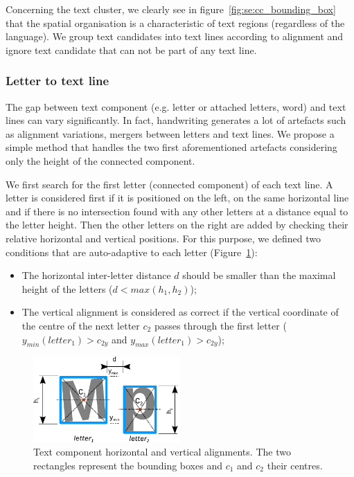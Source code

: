 Concerning the text cluster, we clearly see in figure~\ref{fig:se:cc_bounding_box} that the spatial organisation is a characteristic of text regions (regardless of the language).
We group text candidates into text lines according to alignment and ignore text candidate that can not be part of any text line.

\subsubsection{Letter to text line} %
\label{par:se:letter_to_line}
The gap between text component (e.g. letter or attached letters, word) and text lines can vary significantly.
In fact, handwriting generates a lot of artefacts such as alignment variations, mergers between letters and text lines.
We propose a simple method that handles the two first aforementioned artefacts considering only the height of the connected component.

We first search for the first letter (connected component) of each text line.
A letter is considered first if it is positioned on the left, on the same horizontal line and if there is no intersection found with any other letters at a distance equal to the letter height.
Then the other letters on the right are added by checking their relative horizontal and vertical positions.
For this purpose, we defined two conditions that are auto-adaptive to each letter (Figure~\ref{fig:se:letter_position}):

\begin{itemize}
    \item The horizontal inter-letter distance $d$ should be smaller than the maximal height of the letters ($d<max(h_1,h_2)$);
    \item The vertical alignment is considered as correct if the vertical coordinate of the centre of the next letter $c_2$ passes through the first letter ($y_{min}(letter_1)>c_{2y}$ and $y_{max}(letter_1)>c_{2y}$);
\end{itemize}


\begin{figure}[h!]	%
  \centering
	\includegraphics[trim= 0px 0px 0px 0px, clip, width=0.5\textwidth]{letter_position.pdf}
	\caption[Text component horizontal and vertical alignments]{Text component horizontal and vertical alignments. The two rectangles represent the bounding boxes and $c_1$ and $c_2$ their centres.}
	\label{fig:se:letter_position}
\end{figure}

